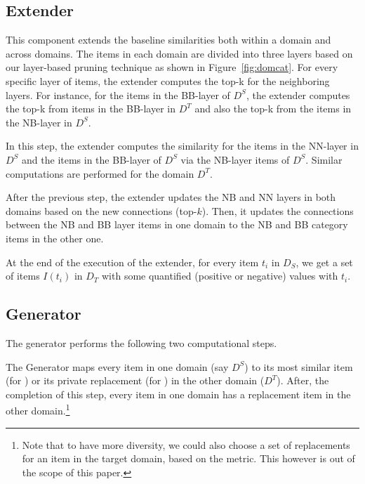 \subsection{Extender}
This component extends the baseline similarities both within a domain and across domains. The items in each domain are divided into three layers based on our layer-based pruning technique as shown in Figure~\ref{fig:domcat}.
For every specific layer of items, the extender computes the top-k for the neighboring layers. For instance, for the items in the BB-layer of $D^S$, the extender computes the top-k from items in the BB-layer in $D^T$ and also the top-k from the items in the NB-layer in $D^S$. 

 In this step, the extender computes the \graphsim similarity for the items in the NN-layer in $D^S$ and the items in the BB-layer of $D^S$ via the NB-layer items of $D^S$. Similar computations are performed for the domain $D^T$.

 After the previous step, the extender updates the NB and NN layers in both domains based on the new connections (top-$k$). Then, it updates the connections between the NB and BB layer items in one domain to the NB and BB category items in the other one.

At the end of the execution of the extender, for every item $t_i$ in $D_S$, we get a set of items $I(t_i)$ in $D_T$ with some quantified (positive or negative) \graphsim values with $t_i$. 

\subsection{Generator}
The generator performs the following two computational steps.

 The Generator maps every item in one domain (say $D^S$) to its most similar item (for \npcrossrec) or its private replacement (for \crossrec) in the other domain ($D^T$). After, the completion of this step, every item in one domain has a replacement item in the other domain.\footnote{Note that to have more diversity, we could also choose a set of replacements for an item in the target domain, based on the \graphsim metric. This however is out of the scope of this paper.}


